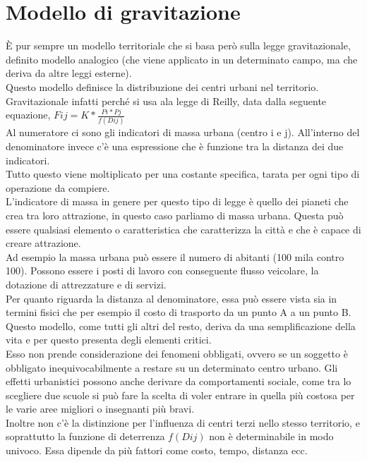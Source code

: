 \documentclass[a4paper,12pt, oneside]{book}
\begin{document}
  \section{Modello di gravitazione}
  È pur sempre un modello territoriale che si basa però sulla legge gravitazionale, definito modello analogico (che viene applicato in un determinato campo, ma che deriva da altre leggi esterne).\\
  Questo modello definisce la distribuzione dei centri urbani nel territorio.\\
  Gravitazionale infatti perché si usa ala legge di Reilly, data dalla seguente equazione, $Fij=K*\frac{Pi*Pj}{f(Dij)}$\\
  Al numeratore ci sono gli indicatori di massa urbana (centro i e j). All'interno del denominatore invece c'è una espressione che è funzione tra la distanza dei due indicatori.\\
  Tutto questo viene moltiplicato per una costante specifica, tarata per ogni tipo  di operazione da compiere.\\
  L'indicatore di massa in genere per questo tipo di legge è quello dei pianeti che crea tra loro attrazione, in questo caso parliamo di massa urbana. Questa può essere qualsiasi elemento o caratteristica che caratterizza la città e che è capace di creare attrazione.\\
  Ad esempio la massa urbana può essere il numero di abitanti (100 mila contro 100). Possono essere i posti di lavoro con conseguente flusso veicolare, la dotazione di attrezzature e di servizi.\\
  Per quanto riguarda la distanza al denominatore, essa può essere vista sia in termini fisici che per esempio il costo di trasporto da un punto A a un punto B.\\
  Questo modello, come tutti gli altri del resto, deriva da una semplificazione della vita e per questo presenta degli elementi critici.\\
  Esso non prende considerazione dei fenomeni obbligati, ovvero se un soggetto è obbligato inequivocabilmente a restare su un determinato centro urbano. Gli effetti urbanistici possono anche derivare da comportamenti sociale, come tra lo scegliere due scuole si può fare la scelta di voler entrare in quella più costosa per le varie aree migliori o insegnanti più bravi.\\
  Inoltre non c'è la distinzione per l'influenza di centri terzi nello stesso territorio, e soprattutto la funzione di deterrenza $f(Dij)$ non è determinabile in modo univoco. Essa dipende da più fattori come costo, tempo, distanza ecc.\\
\end{document}
